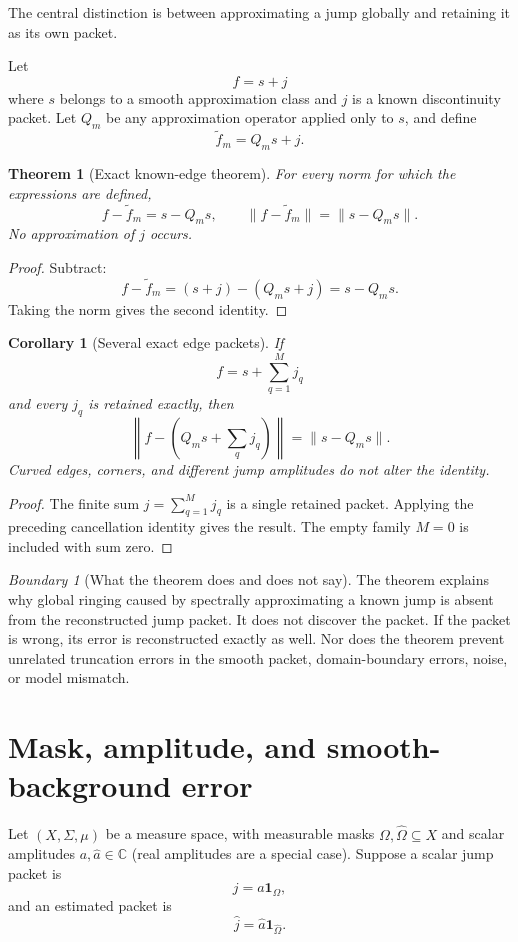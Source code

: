 \documentclass[11pt,letterpaper]{article}
\newtheorem{theorem}{Theorem}[section]
\theoremstyle{plain}
\theoremstyle{plain}
\theoremstyle{plain}
\newtheorem{corollary}[corollary]{Corollary}
\theoremstyle{definition}
\theoremstyle{definition}
\theoremstyle{definition}
\theoremstyle{definition}
\theoremstyle{remark}
\theoremstyle{remark}
\newtheorem{boundary}[boundary]{Boundary}
\theoremstyle{remark}
\theoremstyle{remark}
\newcommand{\bbC}{\mathbb C}
\let\KomorebiPrimitiveWidehat\widehat
\renewcommand{\widehat}[1]{\KomorebiPrimitiveWidehat{#1}}
\begin{document}
The central distinction is between approximating a jump globally and retaining it as its own packet.

Let
\[
f=s+j
\]
where $s$ belongs to a smooth approximation class and $j$ is a known discontinuity packet. Let $Q_m$ be any approximation operator applied only to $s$, and define
\[
\widetilde f_m=Q_ms+j.
\]

\begin{theorem}[Exact known-edge theorem]\label{result:10}
For every norm for which the expressions are defined,
\[
\boxed{
f-\widetilde f_m=s-Q_ms,
\qquad
\|f-\widetilde f_m\|=\|s-Q_ms\|.
}
\]
No approximation of $j$ occurs.
\end{theorem}

\begin{proof}
Subtract:
\[
f-\widetilde f_m=(s+j)-(Q_ms+j)=s-Q_ms.
\]
Taking the norm gives the second identity.
\end{proof}

\begin{corollary}[Several exact edge packets]\label{result:11}
If
\[
f=s+\sum_{q=1}^{M}j_q
\]
and every $j_q$ is retained exactly, then
\[
\left\|f-\left(Q_ms+\sum_qj_q\right)\right\|
=\|s-Q_ms\|.
\]
Curved edges, corners, and different jump amplitudes do not alter the identity.
\end{corollary}
\begin{proof}
The finite sum $j=\sum_{q=1}^M j_q$ is a single retained packet. Applying the preceding cancellation identity gives the result. The empty family $M=0$ is included with sum zero.
\end{proof}

\begin{boundary}[What the theorem does and does not say]\label{core:record:15}
The theorem explains why global ringing caused by spectrally approximating a known jump is absent from the reconstructed jump packet. It does not discover the packet. If the packet is wrong, its error is reconstructed exactly as well. Nor does the theorem prevent unrelated truncation errors in the smooth packet, domain-boundary errors, noise, or model mismatch.
\end{boundary}

\section{Mask, amplitude, and smooth-background error}\label{core:section:07}

Let $(X,\Sigma,\mu)$ be a measure space, with measurable masks $\Omega,\widehat\Omega\subseteq X$ and scalar amplitudes $a,\widehat a\in\bbC$ (real amplitudes are a special case). Suppose a scalar jump packet is
\[
j=a\mathbf 1_{\Omega},
\]
and an estimated packet is
\[
\widehat j=\widehat a\mathbf 1_{\widehat\Omega}.
\]
\end{document}
